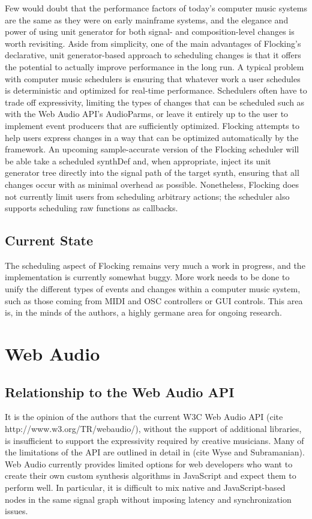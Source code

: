 \documentclass{article}
\begin{document}
Few would doubt that the performance factors of today's computer music systems are the same as they were on early mainframe systems, and the elegance and power of using unit generator for both signal- and composition-level changes is worth revisiting. Aside from simplicity, one of the main advantages of Flocking's declarative, unit generator-based approach to scheduling changes is that it offers the potential to actually improve performance in the long run. A typical problem with computer music schedulers is ensuring that whatever work a user schedules is deterministic and optimized for real-time performance. Schedulers often have to trade off expressivity, limiting the types of changes that can be scheduled such as with the Web Audio API's AudioParms, or leave it entirely up to the user to implement event producers that are sufficiently optimized. Flocking attempts to help users express changes in a way that can be optimized automatically by the framework. An upcoming sample-accurate version of the Flocking scheduler will be able take a scheduled synthDef and, when appropriate, inject its unit generator tree directly into the signal path of the target synth, ensuring that all changes occur with as minimal overhead as possible. Nonetheless, Flocking does not currently limit users from scheduling arbitrary actions; the scheduler also supports scheduling raw functions as callbacks.

\subsection{Current State}

The scheduling aspect of Flocking remains very much a work in progress, and the implementation is currently somewhat buggy. More work needs to be done to unify the different types of events and changes within a computer music system, such as those coming from MIDI and OSC controllers or GUI controls. This area is, in the minds of the authors, a highly germane area for ongoing research.

\section{Web Audio}

\subsection{Relationship to the Web Audio API}

It is the opinion of the authors that the current W3C Web Audio API (cite http://www.w3.org/TR/webaudio/), without the support of additional libraries, is insufficient to support the expressivity required by creative musicians. Many of the limitations of the API are outlined in detail in (cite Wyse and Subramanian). Web Audio currently provides limited options for web developers who want to create their own custom synthesis algorithms in JavaScript and expect them to perform well. In particular, it is difficult to mix native and JavaScript-based nodes in the same signal graph without imposing latency and synchronization issues.
\end{document}
